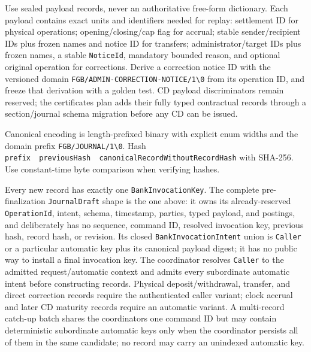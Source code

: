 \documentclass[
  10pt,
  letterpaper,
]{article}
\newcommand{\passthrough}[1]{#1}
\begin{document}
Use sealed payload records, never an authoritative free-form dictionary.
Each payload contains exact units and identifiers needed for replay:
settlement ID for physical operations;
opening/\allowbreak{}closing/\allowbreak{}cap flag for accrual; stable
sender/recipient IDs plus frozen names and notice ID for transfers;
administrator/target IDs plus frozen names, a stable
\passthrough{\lstinline!NoticeId!}, mandatory bounded reason, and
optional original operation for corrections. Derive a correction notice
ID with the versioned domain
\texttt{FGB/}\allowbreak{}\texttt{ADMIN-}\allowbreak{}\texttt{CORRECTION-}\allowbreak{}\texttt{NOTICE/}\allowbreak{}\texttt{1\textbackslash{}}\allowbreak{}\texttt{0}
from its operation ID, and freeze that derivation with a golden test. CD
payload discriminators remain reserved; the certificates plan adds their
fully typed contractual records through a section/journal schema
migration before any CD can be issued.

Canonical encoding is length-prefixed binary with explicit enum widths
and the domain prefix
\texttt{FGB/}\allowbreak{}\texttt{JOURNAL/}\allowbreak{}\texttt{1\textbackslash{}}\allowbreak{}\texttt{0}.
Hash
\texttt{prefix\ }\allowbreak{}\texttt{\textbar{}}\allowbreak{}\texttt{\textbar{}}\allowbreak{}\texttt{\ }\allowbreak{}\texttt{previousHash\ }\allowbreak{}\texttt{\textbar{}}\allowbreak{}\texttt{\textbar{}}\allowbreak{}\texttt{\ }\allowbreak{}\texttt{canonicalRecordWithoutRecordHash}
with SHA-256. Use constant-time byte comparison when verifying hashes.

Every new record has exactly one
\passthrough{\lstinline!BankInvocationKey!}. The complete
pre-finalization \passthrough{\lstinline!JournalDraft!} shape is the one
above: it owns its already-reserved
\passthrough{\lstinline!OperationId!}, intent, schema, timestamp,
parties, typed payload, and postings, and deliberately has no sequence,
command ID, resolved invocation key, previous hash, record hash, or
revision. Its closed \passthrough{\lstinline!BankInvocationIntent!}
union is \passthrough{\lstinline!Caller!} or a particular automatic key
plus its canonical payload digest; it has no public way to install a
final invocation key. The coordinator resolves
\passthrough{\lstinline!Caller!} to the admitted request/automatic
context and admits every subordinate automatic intent before
constructing records. Physical deposit/withdrawal, transfer, and direct
correction records require the authenticated caller variant; clock
accrual and later CD maturity records require an automatic variant. A
multi-record catch-up batch shares the coordinator\textquotesingle s one
command ID but may contain deterministic subordinate automatic keys only
when the coordinator persists all of them in the same candidate; no
record may carry an unindexed automatic key.
\end{document}
